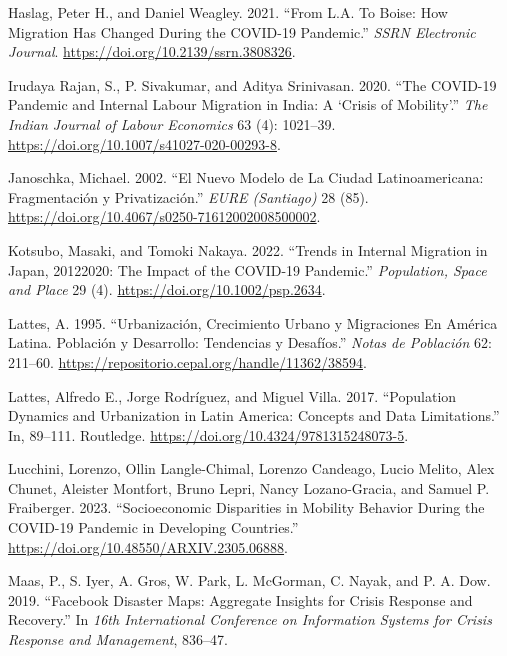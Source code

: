 \documentclass[
  10pt,
  letterpaper,
  DIV=11,
  numbers=noendperiod]{scrartcl}
\newlength{\cslhangindent}
\newlength{\cslentryspacingunit} %
\newenvironment{CSLReferences}[2] %
 {%
  \setlength{\parindent}{0pt}
  \ifodd #1
  \let\oldpar\par
  \def\par{\hangindent=\cslhangindent\oldpar}
  \fi
  \setlength{\parskip}{#2\cslentryspacingunit}
 }%
 {}
\begin{document}
\begin{CSLReferences}{1}{0}
\leavevmode{}%
Haslag, Peter H., and Daniel Weagley. 2021. {``From L.A. To Boise: How
Migration Has Changed During the COVID-19 Pandemic.''} \emph{SSRN
Electronic Journal}. \url{https://doi.org/10.2139/ssrn.3808326}.

\leavevmode{}%
Irudaya Rajan, S., P. Sivakumar, and Aditya Srinivasan. 2020. {``The
COVID-19 Pandemic and Internal Labour Migration in India: A {`}Crisis of
Mobility{'}.''} \emph{The Indian Journal of Labour Economics} 63 (4):
1021--39. \url{https://doi.org/10.1007/s41027-020-00293-8}.

\leavevmode{}%
Janoschka, Michael. 2002. {``El Nuevo Modelo de La Ciudad
Latinoamericana: Fragmentación y Privatización.''} \emph{EURE
(Santiago)} 28 (85).
\url{https://doi.org/10.4067/s0250-71612002008500002}.

\leavevmode{}%
Kotsubo, Masaki, and Tomoki Nakaya. 2022. {``Trends in Internal
Migration in Japan, 2012{\textendash}2020: The Impact of the COVID{-}19
Pandemic.''} \emph{Population, Space and Place} 29 (4).
\url{https://doi.org/10.1002/psp.2634}.

\leavevmode{}%
Lattes, A. 1995. {``Urbanización, Crecimiento Urbano y Migraciones En
América Latina. Población y Desarrollo: Tendencias y Desafíos.''}
\emph{Notas de Población} 62: 211--60.
\url{https://repositorio.cepal.org/handle/11362/38594}.

\leavevmode{}%
Lattes, Alfredo E., Jorge Rodríguez, and Miguel Villa. 2017.
{``Population Dynamics and Urbanization in Latin America: Concepts and
Data Limitations.''} In, 89--111. Routledge.
\url{https://doi.org/10.4324/9781315248073-5}.

\leavevmode{}%
Lucchini, Lorenzo, Ollin Langle-Chimal, Lorenzo Candeago, Lucio Melito,
Alex Chunet, Aleister Montfort, Bruno Lepri, Nancy Lozano-Gracia, and
Samuel P. Fraiberger. 2023. {``Socioeconomic Disparities in Mobility
Behavior During the COVID-19 Pandemic in Developing Countries.''}
\url{https://doi.org/10.48550/ARXIV.2305.06888}.

\leavevmode{}%
Maas, P., S. Iyer, A. Gros, W. Park, L. McGorman, C. Nayak, and P. A.
Dow. 2019. {``Facebook Disaster Maps: Aggregate Insights for Crisis
Response and Recovery.''} In \emph{16th International Conference on
Information Systems for Crisis Response and Management}, 836--47.


\end{CSLReferences}
\end{document}
